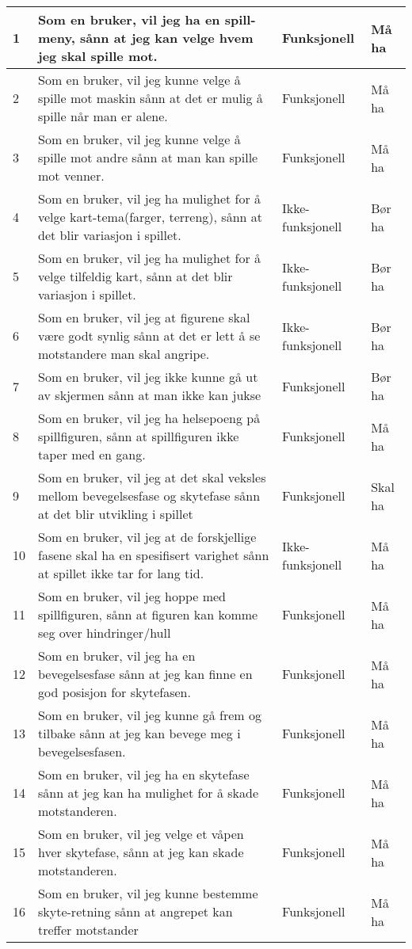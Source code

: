 \begin{longtable}{ | p{1cm} | p{6cm} | p{2.5cm} | p{2cm} |}
1&Som en bruker, vil jeg ha en spill-meny, sånn at jeg kan velge hvem jeg skal spille mot. & Funksjonell & Må ha \\ \hline
2&Som en bruker, vil jeg kunne velge å spille mot maskin sånn at det er mulig å spille når man er alene.&Funksjonell&Må ha\\ \hline
3&Som en bruker, vil jeg kunne velge å spille mot andre sånn at man kan spille mot venner.&Funksjonell&Må ha\\ \hline
4&Som en bruker, vil jeg ha mulighet for å velge kart-tema(farger, terreng), sånn at det blir variasjon i spillet. & Ikke-funksjonell & Bør ha\\ \hline
5&Som en bruker, vil jeg ha mulighet for å velge tilfeldig kart, sånn at det blir variasjon i spillet.	&Ikke-funksjonell&Bør ha \\ \hline
6&Som en bruker, vil jeg at figurene skal være godt synlig sånn at det er lett å se motstandere man skal angripe.&Ikke-funksjonell&Bør ha\\ \hline
7&Som en bruker, vil jeg ikke kunne gå ut av skjermen sånn at man ikke kan jukse&Funksjonell&Bør ha\\ \hline
8&Som en bruker, vil jeg ha helsepoeng på spillfiguren, sånn at spillfiguren ikke taper med en gang.&Funksjonell&Må ha\\ \hline
9&Som en bruker, vil jeg at det skal veksles mellom bevegelsesfase og skytefase sånn at det blir utvikling i spillet&Funksjonell&Skal ha\\ \hline
10&Som en bruker, vil jeg at de forskjellige fasene skal ha en spesifisert varighet sånn at spillet ikke tar for lang tid.&Ikke-funksjonell&Må ha\\ \hline
11&Som en bruker, vil jeg hoppe med spillfiguren, sånn at figuren kan komme seg over hindringer/hull &Funksjonell & Må ha\\ \hline
12&Som en bruker, vil jeg ha en bevegelsesfase sånn at jeg kan finne en god posisjon for skytefasen.&Funksjonell&Må ha \\ \hline
13&Som en bruker, vil jeg kunne gå frem og tilbake sånn at jeg kan bevege meg i bevegelsesfasen.&Funksjonell&Må ha\\ \hline
14&Som en bruker, vil jeg ha en skytefase sånn at jeg kan ha mulighet for å skade motstanderen.&Funksjonell&Må ha\\ \hline
15&Som en bruker, vil jeg velge et våpen hver skytefase, sånn at jeg kan skade motstanderen.&Funksjonell&Må ha\\ \hline
16&Som en bruker, vil jeg kunne bestemme skyte-retning sånn at angrepet kan treffer motstander&Funksjonell&Må ha\\ \hline

\end{longtable}
